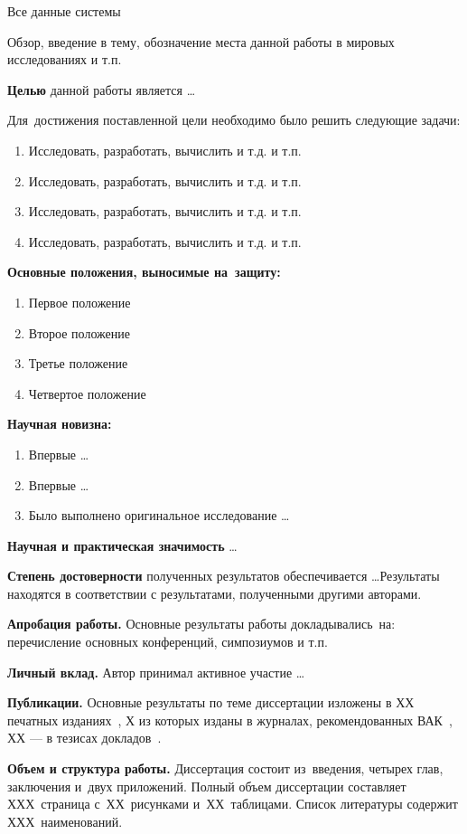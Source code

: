 Все данные системы 


Обзор, введение в тему, обозначение места данной работы в мировых исследованиях и т.п.

\textbf{Целью} данной работы является \ldots

Для~достижения поставленной цели необходимо было решить следующие задачи:
\begin{enumerate}
  \item Исследовать, разработать, вычислить и т.д. и т.п.
  \item Исследовать, разработать, вычислить и т.д. и т.п.
  \item Исследовать, разработать, вычислить и т.д. и т.п.
  \item Исследовать, разработать, вычислить и т.д. и т.п.
\end{enumerate}

\textbf{Основные положения, выносимые на~защиту:}
\begin{enumerate}
  \item Первое положение
  \item Второе положение
  \item Третье положение
  \item Четвертое положение
\end{enumerate}

\textbf{Научная новизна:}
\begin{enumerate}
  \item Впервые \ldots
  \item Впервые \ldots
  \item Было выполнено оригинальное исследование \ldots
\end{enumerate}

\textbf{Научная и практическая значимость} \ldots

\textbf{Степень достоверности} полученных результатов обеспечивается \ldots Результаты находятся в соответствии с результатами, полученными другими авторами.

\textbf{Апробация работы.}
Основные результаты работы докладывались~на:
перечисление основных конференций, симпозиумов и т.п.

\textbf{Личный вклад.} Автор принимал активное участие \ldots

\textbf{Публикации.} Основные результаты по теме диссертации изложены в ХХ печатных изданиях~\cite{bib1,bib2,bib3,bib4,bib5},
Х из которых изданы в журналах, рекомендованных ВАК~\cite{bib1,bib2,bib3}, 
ХХ --- в тезисах докладов~\cite{bib4,bib5}.

\textbf{Объем и структура работы.} Диссертация состоит из~введения, четырех глав, заключения и~двух приложений. Полный объем диссертации составляет ХХХ~страница с~ХХ~рисунками и~ХХ~таблицами. Список литературы содержит ХХХ~наименований.

\clearpage